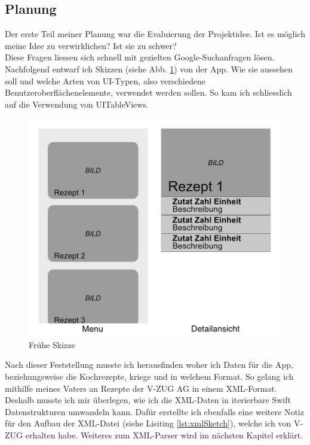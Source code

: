 \documentclass[12pt]{article}
\begin{document}
\subsection{Planung}
Der erste Teil meiner Planung war die Evaluierung der Projektidee. Ist es möglich meine Idee zu verwirklichen? Ist sie zu schwer? \\ Diese Fragen liessen sich schnell mit gezielten Google-Suchanfragen lösen. \\ Nachfolgend entwarf ich Skizzen (siehe Abb. \ref{fig:earlySketch}) von der App. Wie sie aussehen soll und welche Arten von UI-Typen, also verschiedene Benutzeroberflächenelemente, verwendet werden sollen. So kam ich schliesslich auf die Verwendung von UITableViews. \cite{tableviewvideo}\\
\begin{figure}
    \includegraphics[width=\linewidth]{pictures/Sketch.png}
    \caption{Frühe Skizze}
    \label{fig:earlySketch}
\end{figure}
Nach dieser Feststellung musste ich herausfinden woher ich Daten für die App, beziehungsweise die Kochrezepte, kriege und in welchem Format. So gelang ich mithilfe meines Vaters an Rezepte der V-ZUG AG in einem XML-Format. Deshalb musste ich mir überlegen, wie ich die XML-Daten in iterierbare Swift Datenstrukturen umwandeln kann. Dafür erstellte ich ebenfalls eine weitere Notiz für den Aufbau der XML-Datei (siehe Lisiting \ref{lst:xmlSketch}), welche ich von V-ZUG erhalten habe. Weiteres zum XML-Parser wird im nächsten Kapitel erklärt. 
\end{document}
